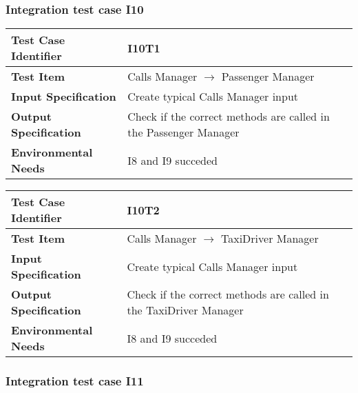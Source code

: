 \subsubsection{Integration test case I10}

\begin{table}[!htbp]
\begin{center}
\begin{tabular}[t]{p{}p{}}

\hline
\textbf{Test Case Identifier} & I10T1 \\
\hline
\textbf{Test Item} & Calls Manager $\rightarrow$ Passenger Manager \\
\hline
\textbf{Input Specification} & Create typical Calls Manager input \\
\hline
\textbf{Output Specification} & Check if the correct methods are called in the Passenger Manager \\
\hline
\textbf{Environmental Needs} & I8 and I9 succeded \\
\hline

\end{tabular}
\end{center}
\end{table}

\begin{table}[!htbp]
\begin{center}
\begin{tabular}[t]{p{}p{}}

\hline
\textbf{Test Case Identifier} & I10T2 \\
\hline
\textbf{Test Item} & Calls Manager $\rightarrow$ TaxiDriver Manager \\
\hline
\textbf{Input Specification} & Create typical Calls Manager input \\
\hline
\textbf{Output Specification} & Check if the correct methods are called in the TaxiDriver Manager \\
\hline
\textbf{Environmental Needs} & I8 and I9 succeded \\
\hline

\end{tabular}
\end{center}
\end{table}

\subsubsection{Integration test case I11}

